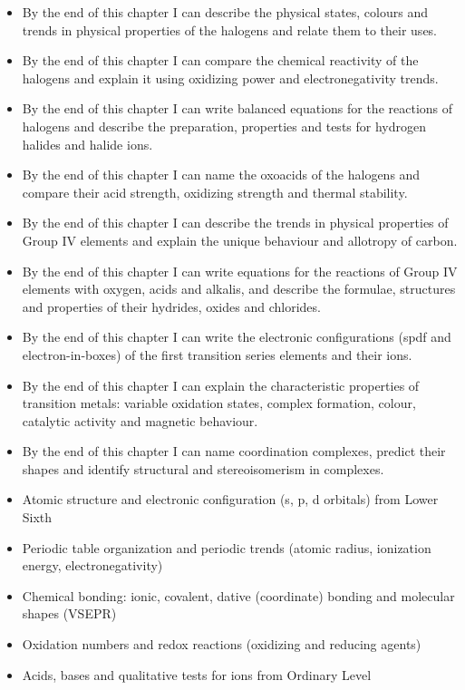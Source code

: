 \documentclass[11pt]{article}
\begin{document}
\begin{objectifs}
\begin{itemize}
\item By the end of this chapter I can describe the physical states, colours and trends in physical properties of the halogens and relate them to their uses.
\item By the end of this chapter I can compare the chemical reactivity of the halogens and explain it using oxidizing power and electronegativity trends.
\item By the end of this chapter I can write balanced equations for the reactions of halogens and describe the preparation, properties and tests for hydrogen halides and halide ions.
\item By the end of this chapter I can name the oxoacids of the halogens and compare their acid strength, oxidizing strength and thermal stability.
\item By the end of this chapter I can describe the trends in physical properties of Group IV elements and explain the unique behaviour and allotropy of carbon.
\item By the end of this chapter I can write equations for the reactions of Group IV elements with oxygen, acids and alkalis, and describe the formulae, structures and properties of their hydrides, oxides and chlorides.
\item By the end of this chapter I can write the electronic configurations (spdf and electron-in-boxes) of the first transition series elements and their ions.
\item By the end of this chapter I can explain the characteristic properties of transition metals: variable oxidation states, complex formation, colour, catalytic activity and magnetic behaviour.
\item By the end of this chapter I can name coordination complexes, predict their shapes and identify structural and stereoisomerism in complexes.
\end{itemize}
\end{objectifs}

\begin{prerequis}
\begin{itemize}
\item Atomic structure and electronic configuration (s, p, d orbitals) from Lower Sixth
\item Periodic table organization and periodic trends (atomic radius, ionization energy, electronegativity)
\item Chemical bonding: ionic, covalent, dative (coordinate) bonding and molecular shapes (VSEPR)
\item Oxidation numbers and redox reactions (oxidizing and reducing agents)
\item Acids, bases and qualitative tests for ions from Ordinary Level
\end{itemize}
\end{prerequis}
\end{document}
